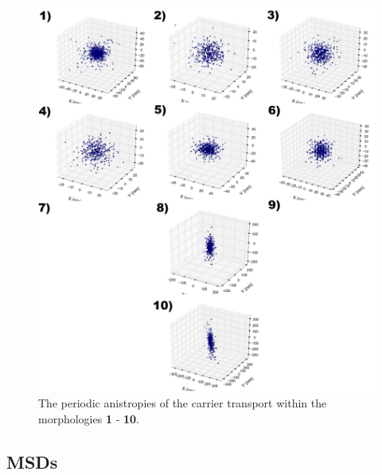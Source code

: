 \documentclass[12pt]{article}
\begin{document}
\begin{figure}[h!]\centering
	\includegraphics[width=\textwidth]{Figures/3dAnisotropy.pdf}
    \caption{The periodic anistropies of the carrier transport within the morphologies \textbf{1} - \textbf{10}.}
	\label{fig:MSD}
\end{figure}

\clearpage
\subsection{MSDs}
\end{document}
